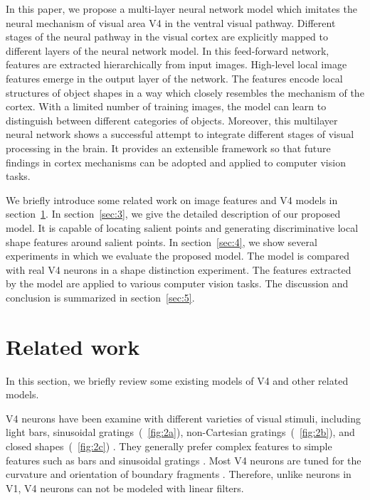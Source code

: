 \documentclass[10pt]{article}
\begin{document}
In this paper, we propose a multi-layer neural network model which imitates the neural mechanism of visual area V4 in the ventral visual pathway.
Different stages of the neural pathway in the visual cortex are explicitly mapped to different layers of the neural network model.
In this feed-forward network, features are extracted hierarchically from input images.
High-level local image features emerge in the output layer of the network. 
The features encode local structures of object shapes in a way which closely resembles the mechanism of the cortex.
With a limited number of training images, the model can learn to distinguish between different categories of objects.
Moreover, this multilayer neural network shows a successful attempt to integrate different stages of visual processing in the brain. 
It provides an extensible framework so that future findings in cortex mechanisms can be adopted and applied to computer vision tasks.

We briefly introduce some related work on image features and V4 models in section~\ref{sec:2}.
In section~\ref{sec:3}, we give the detailed description of our proposed model.
It is capable of locating salient points and generating discriminative local shape features around salient points.
In section~\ref{sec:4}, we show several experiments in which we evaluate the proposed model.
The model is compared with real V4 neurons in a shape distinction experiment.
The features extracted by the model are applied to various computer vision tasks.
The discussion and conclusion is summarized in section~\ref{sec:5}.

\section{Related work}\label{sec:2}

In this section, we briefly review some existing models of V4 and other related models.

V4 neurons have been examine with different varieties of visual stimuli, including light bars, sinusoidal gratings~(\figurename~\ref{fig:2a}),
non-Cartesian gratings~(\figurename~\ref{fig:2b}), and closed shapes~(\figurename~\ref{fig:2c}) \cite{gallant1996,pasupathy2001}.
They generally prefer complex features to simple features such as bars and sinusoidal gratings \cite{gallant1996}.
Most V4 neurons are tuned for the curvature and orientation of boundary fragments \cite{pasupathy2001}.
Therefore, unlike neurons in V1, V4 neurons can not be modeled with linear filters.
\end{document}
